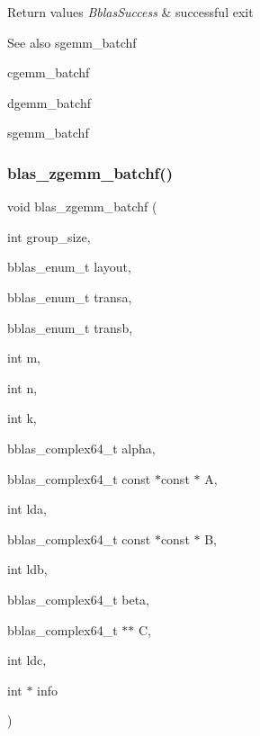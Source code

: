 \begin{DoxyRetVals}{Return values}
{\em Bblas\+Success} & successful exit\\
\hline
\end{DoxyRetVals}
\begin{DoxySeeAlso}{See also}
sgemm\+\_\+batchf 

cgemm\+\_\+batchf 

dgemm\+\_\+batchf 

sgemm\+\_\+batchf 
\end{DoxySeeAlso}
\mbox{\label{group__gemm__batchf_ga2b91753e96ae9bd05c75ebedd35cfce8}} 
\subsubsection{\texorpdfstring{blas\+\_\+zgemm\+\_\+batchf()}{blas\_zgemm\_batchf()}}
{\footnotesize\ttfamily void blas\+\_\+zgemm\+\_\+batchf (\begin{DoxyParamCaption}\item[{int}]{group\+\_\+size,  }\item[{bblas\+\_\+enum\+\_\+t}]{layout,  }\item[{bblas\+\_\+enum\+\_\+t}]{transa,  }\item[{bblas\+\_\+enum\+\_\+t}]{transb,  }\item[{int}]{m,  }\item[{int}]{n,  }\item[{int}]{k,  }\item[{bblas\+\_\+complex64\+\_\+t}]{alpha,  }\item[{bblas\+\_\+complex64\+\_\+t const $\ast$const $\ast$}]{A,  }\item[{int}]{lda,  }\item[{bblas\+\_\+complex64\+\_\+t const $\ast$const $\ast$}]{B,  }\item[{int}]{ldb,  }\item[{bblas\+\_\+complex64\+\_\+t}]{beta,  }\item[{bblas\+\_\+complex64\+\_\+t $\ast$$\ast$}]{C,  }\item[{int}]{ldc,  }\item[{int $\ast$}]{info }\end{DoxyParamCaption})}

